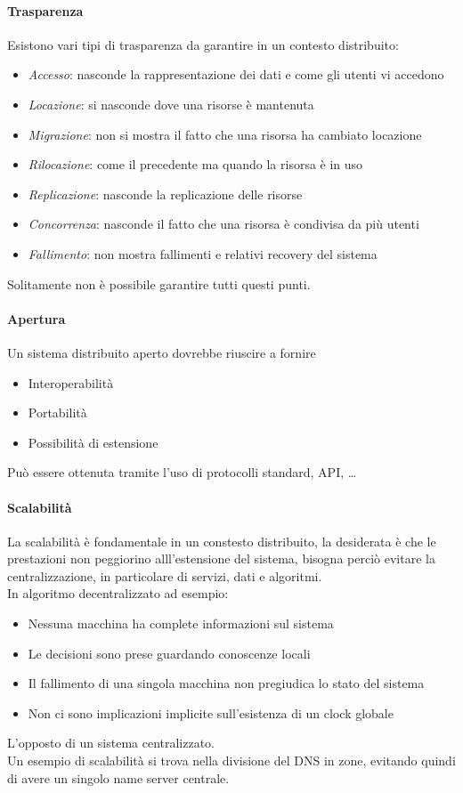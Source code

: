 \paragraph{Trasparenza}
Esistono vari tipi di trasparenza da garantire in un contesto distribuito:
\begin{itemize}
    \item \emph{Accesso}: nasconde la rappresentazione dei dati 
    e come gli utenti vi accedono
    \item \emph{Locazione}: si nasconde dove una risorse è mantenuta
    \item \emph{Migrazione}: non si mostra il fatto che una risorsa ha cambiato 
    locazione
    \item \emph{Rilocazione}: come il precedente ma quando la risorsa è in uso
    \item \emph{Replicazione}: nasconde la replicazione delle risorse
    \item \emph{Concorrenza}: nasconde il fatto che una risorsa è condivisa
    da più utenti
    \item \emph{Fallimento}: non mostra fallimenti e relativi recovery del sistema
\end{itemize}
Solitamente non è possibile garantire tutti questi punti.

\paragraph{Apertura}
Un sistema distribuito aperto dovrebbe riuscire a fornire
\begin{itemize}
    \item Interoperabilità
    \item Portabilità
    \item Possibilità di estensione
\end{itemize}
Può essere ottenuta tramite l'uso di protocolli standard, API, \dots

\paragraph{Scalabilità}
La scalabilità è fondamentale in un constesto distribuito, 
la desiderata è che le prestazioni non peggiorino alll'estensione
del sistema, bisogna perciò evitare la centralizzazione, 
in particolare di servizi, dati e algoritmi.\\
In algoritmo decentralizzato ad esempio:
\begin{itemize}
    \item Nessuna macchina ha complete informazioni sul sistema
    \item Le decisioni sono prese guardando conoscenze locali
    \item Il fallimento di una singola macchina non pregiudica lo stato
    del sistema
    \item Non ci sono implicazioni implicite sull'esistenza di un clock globale
\end{itemize}
L'opposto di un sistema centralizzato.\\
Un esempio di scalabilità si trova nella divisione del DNS in zone, 
evitando quindi di avere un singolo name server centrale.

